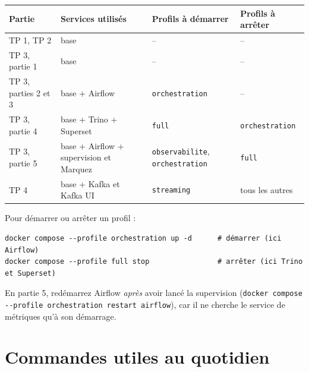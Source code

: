 \documentclass[11pt,a4paper]{article}
\newcommand{\cmd}[1]{\texttt{#1}}
\begin{document}
\begin{center}
\small
\renewcommand{\arraystretch}{1.25}
\begin{tabularx}{\textwidth}{@{}l X l l@{}}
\toprule
\textbf{Partie} & \textbf{Services utilisés} & \textbf{Profils à démarrer} & \textbf{Profils à arrêter} \\
\midrule
TP 1, TP 2               & base                                        & --                                  & -- \\
TP 3, partie 1           & base                                        & --                                  & -- \\
TP 3, parties 2 et 3     & base + Airflow                              & \cmd{orchestration}                 & -- \\
TP 3, partie 4           & base + Trino + Superset                     & \cmd{full}                          & \cmd{orchestration} \\
TP 3, partie 5           & base + Airflow + supervision et Marquez     & \cmd{observabilite}, \cmd{orchestration} & \cmd{full} \\
TP 4                     & base + Kafka et Kafka UI                    & \cmd{streaming}                     & tous les autres \\
\bottomrule
\end{tabularx}
\end{center}

Pour démarrer ou arrêter un profil :
\begin{lstlisting}[style=shell]
docker compose --profile orchestration up -d      # démarrer (ici Airflow)
docker compose --profile full stop                # arrêter (ici Trino et Superset)
\end{lstlisting}
En partie 5, redémarrez Airflow \emph{après} avoir lancé la supervision
(\cmd{docker compose -{}-profile orchestration restart airflow}), car il ne cherche le service de
métriques qu'à son démarrage.

\section{Commandes utiles au quotidien}
\end{document}
